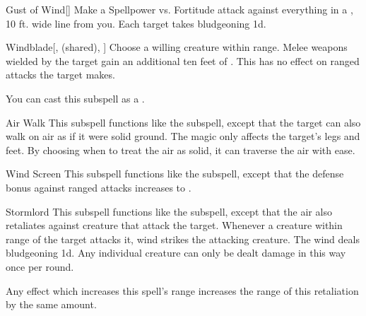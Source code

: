 \begin{ability}[\nth{3}]{Gust of Wind}[]
Make a Spellpower vs. Fortitude attack against everything in a \arealarge, 10 ft. wide line from you.
\hit Each target takes bludgeoning  \minus1d.
\end{ability}
\vspace{0.25em}


\begin{ability}[\nth{3}]{Windblade}[,  (shared), ]
Choose a willing creature within \rngclose range.
Melee weapons wielded by the target gain an additional ten feet of .
This has no effect on ranged attacks the target makes.

You can cast this subspell as a .
\end{ability}
\vspace{0.25em}


\begin{ability}[\nth{4}]{Air Walk}
This subspell functions like the  subspell, except that the target can also walk on air as if it were solid ground.
The magic only affects the target's legs and feet.
By choosing when to treat the air as solid, it can traverse the air with ease.
\end{ability}
\vspace{0.25em}


\begin{ability}[\nth{4}]{Wind Screen}
This subspell functions like the  subspell, except that the defense bonus against ranged attacks increases to .
\end{ability}
\vspace{0.25em}


\begin{ability}[\nth{5}]{Stormlord}
This subspell functions like the  subspell, except that the air also retaliates against creature that attack the target.
Whenever a creature within \rngclose range of the target attacks it, wind strikes the attacking creature.
The wind deals bludgeoning  \minus1d.
Any individual creature can only be dealt damage in this way once per round.

Any effect which increases this spell's range increases the range of this retaliation by the same amount.
\end{ability}
\vspace{0.25em}


